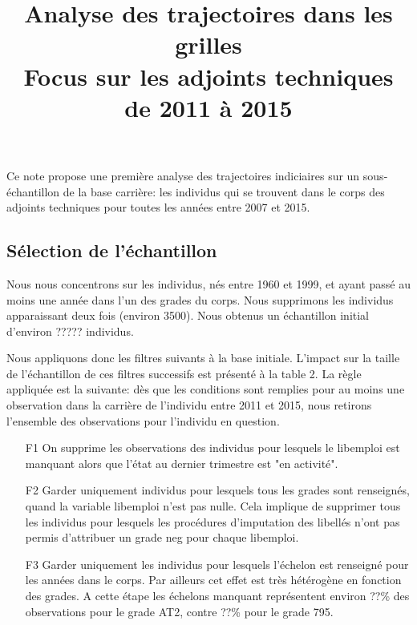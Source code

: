 \documentclass[11pt,a4paper]{article}
\begin{document}
\title{Analyse des trajectoires dans les grilles \\ Focus sur les adjoints techniques de 2011 à 2015}


\author{}


\maketitle

Ce note propose une première analyse des trajectoires indiciaires sur un sous-échantillon de la base carrière: les individus qui se trouvent dans le corps des adjoints techniques pour toutes les années entre 2007 et 2015. 

\renewcommand*\contentsname{\textsc{Plan de la note}}
\tableofcontents

\clearpage


\subsection{Sélection de l'échantillon}

Nous nous concentrons sur les individus, nés entre 1960 et 1999, et ayant passé au moins une année dans l'un des grades du corps. Nous supprimons les individus apparaissant deux fois (environ 3500). Nous obtenus un échantillon initial d'environ ????? individus. 

Nous appliquons donc les filtres suivants à la base initiale. L'impact sur la taille de l'échantillon de ces filtres successifs est présenté à la table 2. La règle appliquée est la suivante: dès que les conditions sont remplies pour au moins une observation dans la carrière de l'individu entre 2011 et 2015, nous retirons l'ensemble des observations pour l'individu en question. 
\begin{enumerate}[leftmargin=1cm ,parsep=0cm,itemsep=0cm,topsep=0cm] 
	\item[F1] On supprime les observations des individus pour lesquels le libemploi est manquant alors que l'état au dernier trimestre est "en activité". 
	\item[F2] Garder uniquement individus pour lesquels tous les grades sont renseignés, quand la variable libemploi n'est pas nulle. Cela implique de supprimer tous les individus pour lesquels les procédures d'imputation des libellés n'ont pas permis d'attribuer un grade neg pour chaque libemploi.
	\item[F3] Garder uniquement les individus pour lesquels l'échelon est renseigné pour les années dans le corps. Par ailleurs cet effet est très hétérogène en fonction des grades. A cette étape les échelons manquant représentent environ ??\% des observations pour le grade AT2, contre ??\% pour le grade 795.
\end{enumerate}
\end{document}
